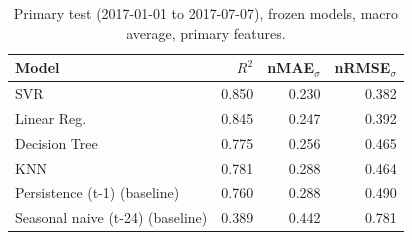 \documentclass[conference]{IEEEtran}
\begin{document}
\begin{table}[t]
\caption{Primary test (2017-01-01 to 2017-07-07), frozen models, macro average, primary features.}\label{tab:test}
\centering\small
\begin{tabular}{lrrr}
\toprule
Model & $R^2$ & nMAE$_\sigma$ & nRMSE$_\sigma$\\
\midrule
SVR & 0.850 & 0.230 & 0.382 \\
Linear Reg. & 0.845 & 0.247 & 0.392 \\
Decision Tree & 0.775 & 0.256 & 0.465 \\
KNN & 0.781 & 0.288 & 0.464 \\
Persistence (t-1) (baseline) & 0.760 & 0.288 & 0.490 \\
Seasonal naive (t-24) (baseline) & 0.389 & 0.442 & 0.781 \\

\bottomrule
\end{tabular}
\end{table}
\end{document}
